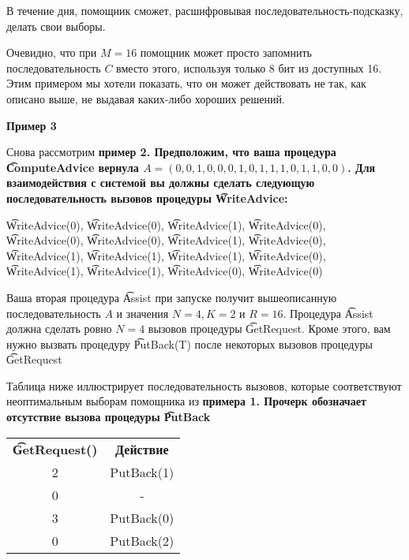 В течение дня, помощник сможет, расшифровывая последовательность-подсказку, делать свои выборы.

Очевидно, что при $M = 16$ помощник может просто запомнить последовательность $C$ вместо этого, используя только 8 бит из доступных 16. Этим примером мы хотели показать, что он может действовать не так, как описано выше, не выдавая каких-либо хороших решений.

\bf{Пример 3}

Снова рассмотрим \bf{пример 2}. Предположим, что ваша процедура \t{ComputeAdvice} вернула $A = (0, 0, 1, 0, 0, 0, 1, 0, 1, 1, 1, 0, 1, 1, 0, 0)$. Для взаимодействия с системой вы должны сделать следующую последовательность вызовов процедуры \t{WriteAdvice}: 

\t{WriteAdvice(0)}, \t{WriteAdvice(0)}, \t{WriteAdvice(1)}, \t{WriteAdvice(0)}, \t{WriteAdvice(0)}, \t{WriteAdvice(0)}, \t{WriteAdvice(1)}, \t{WriteAdvice(0)}, \t{WriteAdvice(1)}, \t{WriteAdvice(1)}, \t{WriteAdvice(1)}, \t{WriteAdvice(0)}, \t{WriteAdvice(1)}, \t{WriteAdvice(1)}, \t{WriteAdvice(0)}, \t{WriteAdvice(0)}

Ваша вторая процедура \t{Assist} при запуске получит вышеописанную последовательность $A$ и значения $N = 4, K = 2$ и $R = 16$. Процедура \t{Assist} должна сделать ровно $N = 4$ вызовов процедуры \t{GetRequest}. Кроме этого, вам нужно вызвать процедуру \t{PutBack(T)} после некоторых вызовов процедуры \t{GetRequest}

Таблица ниже иллюстрирует последовательность вызовов, которые соответствуют неоптимальным выборам помощника из \bf{примера 1}. Прочерк обозначает отсутствие вызова процедуры \t{PutBack}

\begin{tabular}{cc}
\bf{\t{GetRequest()}}&\bf{Действие}\\
2 &PutBack(1)\\
0 &-\\
3 &PutBack(0)\\
0 &PutBack(2)\\
\end{tabular}


